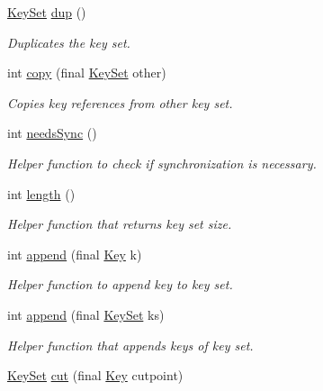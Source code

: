 \begin{DoxyCompactItemize}
\hyperlink{classorg_1_1libelektra_1_1KeySet}{Key\+Set} \hyperlink{classorg_1_1libelektra_1_1KeySet_af3571c68cd55983c45666cf9f75143a1}{dup} ()
\begin{DoxyCompactList}\small\item\em Duplicates the key set. \end{DoxyCompactList}\item 
int \hyperlink{classorg_1_1libelektra_1_1KeySet_a32cba0dbe638373296fb242a698ad1cb}{copy} (final \hyperlink{classorg_1_1libelektra_1_1KeySet}{Key\+Set} other)
\begin{DoxyCompactList}\small\item\em Copies key references from other key set. \end{DoxyCompactList}\item 
int \hyperlink{classorg_1_1libelektra_1_1KeySet_a9a21c729da19bc6fb2e7f33fe06ee15e}{needs\+Sync} ()
\begin{DoxyCompactList}\small\item\em Helper function to check if synchronization is necessary. \end{DoxyCompactList}\item 
int \hyperlink{classorg_1_1libelektra_1_1KeySet_aac3920fa38179de07bcd242207915540}{length} ()
\begin{DoxyCompactList}\small\item\em Helper function that returns key set size. \end{DoxyCompactList}\item 
int \hyperlink{classorg_1_1libelektra_1_1KeySet_a5c1738709f8ccda0929204c9151e773e}{append} (final \hyperlink{classorg_1_1libelektra_1_1Key}{Key} k)
\begin{DoxyCompactList}\small\item\em Helper function to append key to key set. \end{DoxyCompactList}\item 
int \hyperlink{classorg_1_1libelektra_1_1KeySet_a383722346ce590f7bc00aae82c1d035d}{append} (final \hyperlink{classorg_1_1libelektra_1_1KeySet}{Key\+Set} ks)
\begin{DoxyCompactList}\small\item\em Helper function that appends keys of key set. \end{DoxyCompactList}\item 
\hyperlink{classorg_1_1libelektra_1_1KeySet}{Key\+Set} \hyperlink{classorg_1_1libelektra_1_1KeySet_a470743c3a6f873427d057c6ce7e3661c}{cut} (final \hyperlink{classorg_1_1libelektra_1_1Key}{Key} cutpoint)

\end{DoxyCompactItemize}
